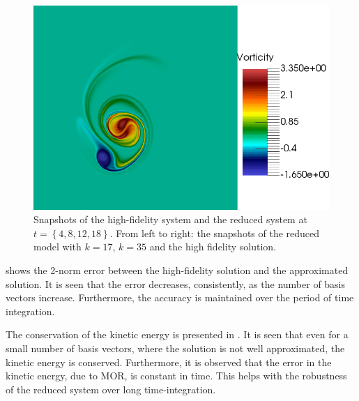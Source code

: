 \begin{figure}[t]
\includegraphics[scale=0.06]{data/Incompressible_Euler/Snapshots/Full_5.png}

\caption{Snapshots of the high-fidelity system and the reduced system at $t=\left\{ 4,8,12,18 \right\}$. From left to right: the snapshots of the reduced model with $k=17$, $k=35$ and the high fidelity solution.}
\label{fig:snap_solution_incompressible_Euler}
\end{figure}


 shows the 2-norm error between the high-fidelity solution and the approximated solution. It is seen that the error decreases, consistently, as the number of basis vectors increase. Furthermore, the accuracy is maintained over the period of time integration.

The conservation of the kinetic energy is presented in . It is seen that even for a small number of basis vectors, where the solution is not well approximated, the kinetic energy is conserved. Furthermore, it is observed that the error in the kinetic energy, due to MOR, is constant in time. This helps with the robustness of the reduced system over long time-integration.


